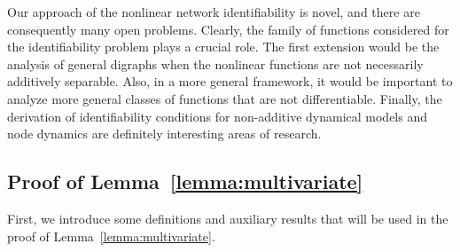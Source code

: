 \documentclass[letterpaper,10pt,journal]{IEEEtran}
\begin{document}
Our approach of the nonlinear network identifiability is novel, and there are consequently many open problems.
Clearly, the family of functions considered for the identifiability problem plays a crucial role. The first extension would be the analysis of general digraphs when the nonlinear functions are not necessarily additively separable. Also, in a more general framework, it would be important to analyze more general classes of functions that are not differentiable. 
Finally, the derivation of identifiability conditions for non-additive dynamical models and node dynamics \cite{vanelli2025local} are definitely interesting areas of research.






\appendix


\subsection{Proof of Lemma~\ref{lemma:multivariate}}\label{app:1}





First, we introduce some definitions and auxiliary results that will be used in the proof of Lemma~\ref{lemma:multivariate}.
\end{document}
